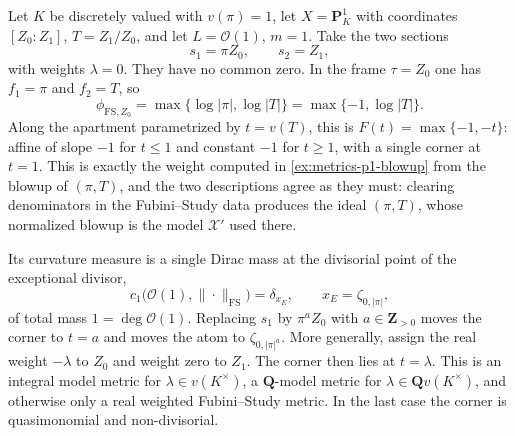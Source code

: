 \begin{example}
\label{ex:metrics-fs-p1-written}
Let $K$ be discretely valued with $v(\pi)=1$, let
$X=\mathbf P^1_K$ with coordinates $[Z_0:Z_1]$, $T=Z_1/Z_0$, and let
$L=\mathcal O(1)$, $m=1$. Take the two sections
\[
 s_1=\pi Z_0,\qquad s_2=Z_1,
\]
with weights $\lambda=0$. They have no common zero. In the frame
$\tau=Z_0$ one has $f_1=\pi$ and $f_2=T$, so
\[
 \phi_{\mathrm{FS},Z_0}
 =\max\{\log|\pi|,\log|T|\}
 =\max\{-1,\log|T|\} .
\]
Along the apartment parametrized by $t=v(T)$, this is
$F(t)=\max\{-1,-t\}$: affine of slope $-1$ for $t\le1$ and constant
$-1$ for $t\ge1$, with a single corner at $t=1$. This is exactly the
weight computed in \cref{ex:metrics-p1-blowup} from the blowup of
$(\pi,T)$, and the two descriptions agree as they must: clearing
denominators in the Fubini--Study data produces the ideal $(\pi,T)$, whose
normalized blowup is the model $\mathcal X'$ used there.

Its curvature measure is a single Dirac mass at the divisorial point of the
exceptional divisor,
\[
 c_1\bigl(\mathcal O(1),\|\cdot\|_{\mathrm{FS}}\bigr)=\delta_{x_E},
 \qquad x_E=\zeta_{0,|\pi|},
\]
of total mass $1=\deg\mathcal O(1)$. Replacing $s_1$ by $\pi^aZ_0$
with $a\in\mathbf Z_{>0}$ moves the corner to $t=a$ and moves the atom to
$\zeta_{0,|\pi|^a}$.  More generally, assign the real weight
$-\lambda$ to $Z_0$ and weight zero to $Z_1$.  The corner then lies at
$t=\lambda$.  This is an integral model metric for
$\lambda\in v(K^\times)$, a $\mathbf Q$-model metric for
$\lambda\in\mathbf Qv(K^\times)$, and otherwise only a real weighted
Fubini--Study metric.  In the last case the corner is quasimonomial and
non-divisorial.
\end{example}

